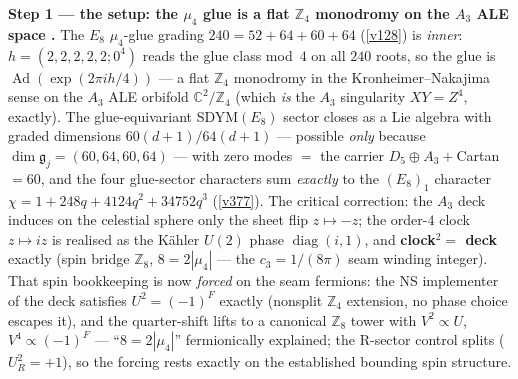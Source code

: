 \documentclass[11pt,a4paper]{article}
\newcommand{\cthree}{c_3}
\newcommand{\Z}{\mathbb{Z}}
\theoremstyle{definition}
\begin{document}
\par\smallskip\noindent\textbf{Step 1 --- the setup: the $\mu_4$ glue is a flat $\Z_4$ monodromy on the
$A_3$ ALE space \mE.} The $E_8$ $\mu_4$-glue grading
$240=52{+}64{+}60{+}64$ (\vref{v128}) is \emph{inner}: $h=(2,2,2,2,2;0^4)$ reads the glue class mod~$4$
on all $240$ roots, so the glue is $\operatorname{Ad}(\exp(2\pi ih/4))$ --- a flat $\Z_4$ monodromy in
the Kronheimer--Nakajima sense on the $A_3$ ALE orbifold $\mathbb C^2/\Z_4$ (which \emph{is} the $A_3$
singularity $XY=Z^4$, exactly). The glue-equivariant SDYM$(E_8)$ sector closes as a Lie algebra with
graded dimensions $60(d{+}1)/64(d{+}1)$ --- possible \emph{only} because
$\dim\mathfrak g_j=(60,64,60,64)$ --- with zero modes $=$ the carrier $D_5{\oplus}A_3{+}$Cartan $=60$,
and the four glue-sector characters sum \emph{exactly} to the $(E_8)_1$ character
$\chi=1{+}248q{+}4124q^2{+}34752q^3$ (\vref{v377}). The critical correction: the $A_3$ deck induces on
the celestial sphere only the sheet flip $z\mapsto-z$; the order-$4$ clock $z\mapsto iz$ is realised as
the K\"ahler $U(2)$ phase $\operatorname{diag}(i,1)$, and \textbf{clock$^2=$ deck} exactly (spin bridge
$\Z_8$, $8=2|\mu_4|$ --- the $\cthree=1/(8\pi)$ seam winding integer).
 That spin bookkeeping is now \emph{forced} on the seam
fermions: the NS implementer of the deck satisfies $U^2=(-1)^F$ exactly (nonsplit $\Z_4$ extension,
no phase choice escapes it), and the quarter-shift lifts to a canonical $\Z_8$ tower with
$V^2\propto U$, $V^4\propto(-1)^F$ --- ``$8=2|\mu_4|$'' fermionically explained; the R-sector
control splits ($U_R^2=+1$), so the forcing rests exactly on the established bounding spin
structure. 
\end{document}
